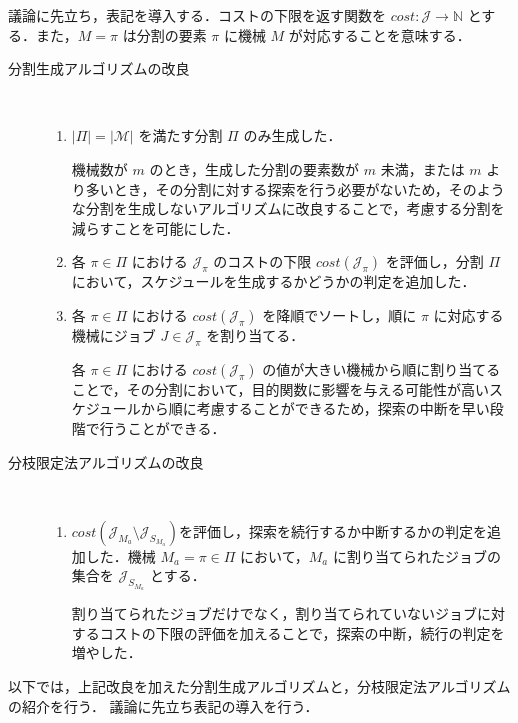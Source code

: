 \documentclass[12pt]{optlab-bachelor}
\begin{document}
議論に先立ち，表記を導入する．コストの下限を返す関数を $cost : \mathcal{J} \to \mathbb{N}$ とする．また，$M = \pi$ は分割の要素 $\pi$ に機械 $M$ が対応することを意味する．
\begin{description}
  \item[分割生成アルゴリズムの改良] ~
  \begin{enumerate}
    \setlength{\leftskip}{-10mm}
    \item $|\Pi| = |\mathcal{M}|$ を満たす分割 $\Pi$ のみ生成した．

    機械数が $m$ のとき，生成した分割の要素数が $m$ 未満，または $m$ より多いとき，その分割に対する探索を行う必要がないため，そのような分割を生成しないアルゴリズムに改良することで，考慮する分割を減らすことを可能にした．

    \item 各 $\pi \in \Pi$ における $\mathcal{J}_{\pi}$ のコストの下限 $cost(\mathcal{J}_{\pi})$ を評価し，分割 $\Pi$ において，スケジュールを生成するかどうかの判定を追加した．

    \item 各 $\pi \in \Pi$ における $cost(\mathcal{J}_{\pi})$ を降順でソートし，順に $\pi$ に対応する機械にジョブ $J \in \mathcal{J}_{\pi}$ を割り当てる．

    各 $\pi \in \Pi$ における $cost(\mathcal{J}_{\pi})$ の値が大きい機械から順に割り当てることで，その分割において，目的関数に影響を与える可能性が高いスケジュールから順に考慮することができるため，探索の中断を早い段階で行うことができる．

  \end{enumerate}
  \item[分枝限定法アルゴリズムの改良] ~
  \begin{enumerate}
    \setlength{\leftskip}{-10mm}
    \item $cost(\mathcal{J}_{M_a} \setminus \mathcal{J}_{S_{M_a}})$を評価し，探索を続行するか中断するかの判定を追加した．機械 $M_a = \pi \in \Pi$ において，$M_a$ に割り当てられたジョブの集合を $\mathcal{J}_{S_{M_a}}$ とする．

    割り当てられたジョブだけでなく，割り当てられていないジョブに対するコストの下限の評価を加えることで，探索の中断，続行の判定を増やした．
  \end{enumerate}
\end{description}

以下では，上記改良を加えた分割生成アルゴリズムと，分枝限定法アルゴリズムの紹介を行う．
議論に先立ち表記の導入を行う．
\end{document}
